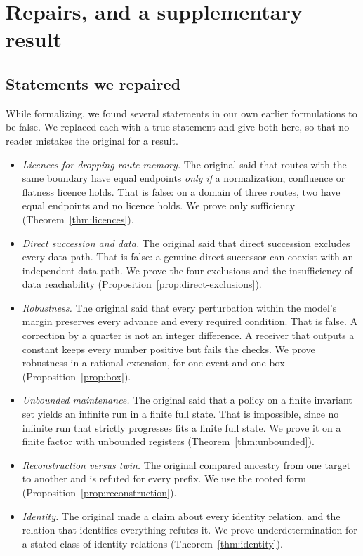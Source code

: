 \section{Repairs, and a supplementary result}
\label{app:proofs}

\subsection{Statements we repaired}

While formalizing, we found several statements in our own earlier formulations
to be false. We replaced each with a true statement and give both here, so that
no reader mistakes the original for a result.
\begin{itemize}
\item \emph{Licences for dropping route memory.} The original said that routes
with the same boundary have equal endpoints \emph{only if} a normalization,
confluence or flatness licence holds. That is false: on a domain of three
routes, two have equal endpoints and no licence holds. We prove only
sufficiency (Theorem~\ref{thm:licences}).
\item \emph{Direct succession and data.} The original said that direct
succession excludes every data path. That is false: a genuine direct successor
can coexist with an independent data path. We prove the four exclusions and the
insufficiency of data reachability (Proposition~\ref{prop:direct-exclusions}).
\item \emph{Robustness.} The original said that every perturbation within the
model's margin preserves every advance and every required condition. That is
false. A correction by a quarter is not an integer difference. A receiver
that outputs a constant keeps every number positive but fails the checks. We
prove robustness in a rational extension, for one event and one box
(Proposition~\ref{prop:box}).
\item \emph{Unbounded maintenance.} The original said that a policy on a
finite invariant set yields an infinite run in a finite full state. That is
impossible, since no infinite run that strictly progresses fits a finite full
state. We prove it on a finite factor with unbounded registers
(Theorem~\ref{thm:unbounded}).
\item \emph{Reconstruction versus twin.} The original compared ancestry from
one target to another and is refuted for every prefix. We use the rooted form
(Proposition~\ref{prop:reconstruction}).
\item \emph{Identity.} The original made a claim about every identity
relation, and the relation that identifies everything refutes it. We prove
underdetermination for a stated class of identity relations
(Theorem~\ref{thm:identity}).
\end{itemize}

